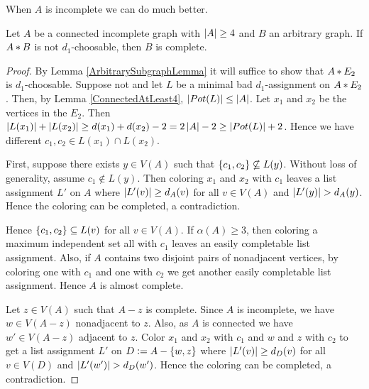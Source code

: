 When $A$ is incomplete we can do much better.
\begin{lem}\label{ConnectedIncompleteAtLeast4}
Let $A$ be a connected incomplete graph with $\left|A\right| \geq 4$ and $B$ an arbitrary graph. If $A \mbox{\hspace{2 pt}$\ast$\hspace{2 pt}} B$ is not $d_1$-choosable, then $B$ is complete.
\end{lem}
\begin{proof}
By Lemma \ref{ArbitrarySubgraphLemma} it will suffice to show that $A \mbox{\hspace{2 pt}$\ast$\hspace{2 pt}} E_2$ is $d_1$-choosable.  Suppose not and let $L$ be a minimal bad $d_1$-assignment on $A \mbox{\hspace{2 pt}$\ast$\hspace{2 pt}} E_2$.  Then, by Lemma \ref{ConnectedAtLeast4}, $\left|Pot(L)\right| \leq \left|A\right|$.  Let $x_1$ and $x_2$ be the vertices in the $E_2$.  Then $\left|L(x_1)\right| + \left|L(x_2)\right| \geq d(x_1) + d(x_2) - 2 = 2\left|A\right| - 2 \geq \left|Pot(L)\right| + 2$.  Hence we have different $c_1, c_2 \in L(x_1) \cap L(x_2)$.  

First, suppose there exists $y \in V(A)$ such that $\left\{ c_1, c_2 \right\} \not \subseteq L(y)$.  Without loss of generality, assume $c_1 \not \in L(y)$.  Then coloring $x_1$ and $x_2$ with $c_1$ leaves a list assignment $L'$ on $A$ where $\left|L'(v)\right| \geq d_A(v)$ for all $v \in V(A)$ and $\left|L'(y)\right| > d_A(y)$.  Hence the coloring can be completed, a contradiction.

Hence $\left\{ c_1, c_2 \right\} \subseteq L(v)$ for all $v \in V(A)$.  If $\alpha(A) \geq 3$, then coloring a maximum independent set all with $c_1$ leaves an easily completable list assignment.  Also, if $A$ contains two disjoint pairs of nonadjacent vertices, by coloring one with $c_1$ and one with $c_2$ we get another easily completable list assignment.  Hence $A$ is almost complete.  

Let $z \in V(A)$ such that $A - z$ is complete.  Since $A$ is incomplete, we have $w \in V(A-z)$ nonadjacent to $z$.  Also, as $A$ is connected we have $w' \in V(A-z)$ adjacent to $z$.  Color $x_1$ and $x_2$ with $c_1$ and $w$ and $z$ with $c_2$ to get a list assignment $L'$ on $D \mathrel{\mathop:}= A - \left\{ w, z \right\}$ where
$\left|L'(v)\right| \geq d_D(v)$ for all $v \in V(D)$ and $\left|L'(w')\right| > d_D(w')$.  Hence the coloring can be completed, a contradiction.
\end{proof}

